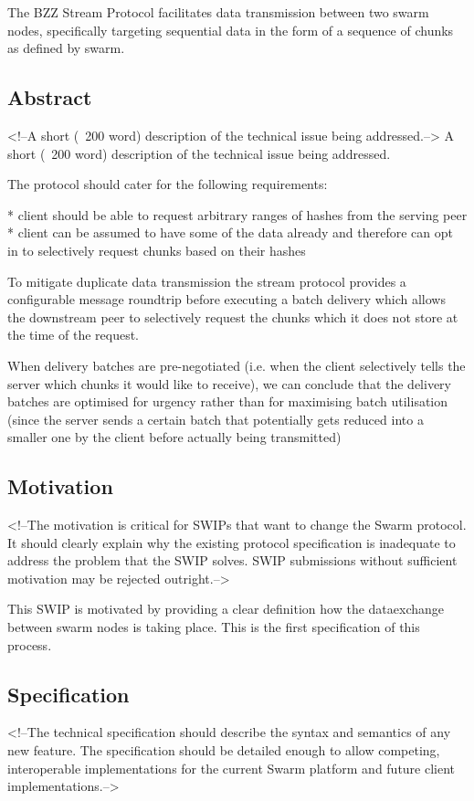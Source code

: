 
The BZZ Stream Protocol facilitates data transmission between two swarm nodes, specifically targeting sequential data in the form of a sequence of chunks as defined by swarm.

\subsection{Abstract}
<!--A short (~200 word) description of the technical issue being addressed.-->
A short (~200 word) description of the technical issue being addressed.

The protocol should cater for the following requirements:

 * client should be able to request arbitrary ranges of hashes from the serving peer
 * client can be assumed to have some of the data already and therefore can opt in to selectively request chunks based on their hashes

To mitigate duplicate data transmission the stream protocol provides a configurable message roundtrip before executing a batch delivery which allows the downstream peer to selectively request the chunks which it does not store at the time of the request. 

When delivery batches are pre-negotiated (i.e. when the client selectively tells the server which chunks it would like to receive), we can conclude that the delivery batches are optimised for urgency rather than for maximising batch utilisation (since the server sends a certain batch that potentially gets reduced into a smaller one by the client before actually being transmitted)

\subsection{Motivation}
<!--The motivation is critical for SWIPs that want to change the Swarm protocol. It should clearly explain why the existing protocol specification is inadequate to address the problem that the SWIP solves. SWIP submissions without sufficient motivation may be rejected outright.-->

This SWIP is motivated by providing a clear definition how the dataexchange between swarm nodes is taking place. This is the first specification of this process.

\subsection{Specification}
<!--The technical specification should describe the syntax and semantics of any new feature. The specification should be detailed enough to allow competing, interoperable implementations for the current Swarm platform and future client implementations.-->

